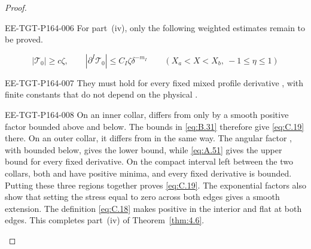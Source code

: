 \begin{proof}
\begin{EESegment}{EE-TGT-P164-006}
For part~\textup{(iv)}, only the following weighted estimates remain to be proved.
\end{EESegment}
\begin{equation}
  |\mathcal T_0|\geq c\zeta,
  \qquad
  |\partial^I\mathcal T_0|\leq C_I\zeta\delta^{-m_I}
  \qquad (X_a<X<X_b,\ -1\leq\eta\leq1)
  \tag{C.19}\label{eq:C.19}
\end{equation}
\begin{EESegment}{EE-TGT-P164-007}
They must hold for every fixed mixed profile derivative
, with finite constants that do not depend on the physical
.
\end{EESegment}

\begin{EESegment}{EE-TGT-P164-008}
On an inner collar,  differs from
 only by a smooth positive factor bounded above
and below. The bounds in \eqref{eq:B.31} therefore give \eqref{eq:C.19} there. On
an outer collar, it differs from  in the same
way. The angular factor
, with
 bounded below, gives the lower bound, while
\eqref{eq:A.51} gives the upper bound for every fixed derivative. On the compact interval left between the two collars, both  and
 have positive minima, and every
fixed derivative is bounded. Putting these three regions together proves
\eqref{eq:C.19}. The exponential factors also show that setting the stress equal to zero across both edges gives a smooth extension. The definition \eqref{eq:C.18} makes
 positive in the interior and flat at both edges. This completes part~\textup{(iv)} of Theorem~\ref{thm:4.6}.
\end{EESegment}


\end{proof}
